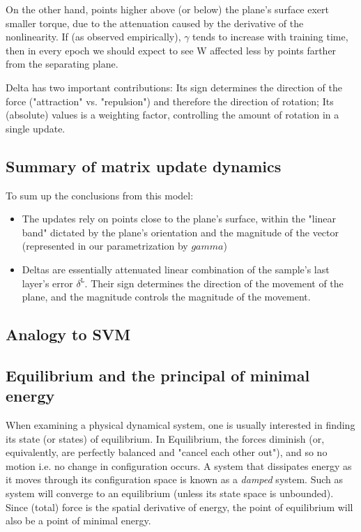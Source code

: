 \documentclass[]{article}
\begin{document}
 		On the other hand, points higher above (or below) the plane's surface exert smaller torque, due to the attenuation caused by the derivative of the nonlinearity. If (as observed empirically), $\gamma$ tends to increase with training time, then in every epoch we should expect to see W affected less by points farther from the separating plane.
 		
 		Delta has two important contributions: Its sign determines the direction of the force ("attraction" vs. "repulsion") and therefore the direction of rotation; Its (absolute) values is a weighting factor, controlling the amount of rotation in a single update.
 	
 	\subsection{Summary of matrix update dynamics}
 		To sum up the conclusions from this model:
 		\begin{itemize}
 			\item The updates rely on points close to the plane's surface, within the "linear band" dictated by the plane's orientation and the magnitude of the vector (represented in our parametrization by $gamma$)
 			\item Deltas are essentially attenuated linear combination of the sample's last layer's error $\delta^\mathtt{L}$. Their sign determines the direction of the movement of the plane, and the magnitude controls the magnitude of the movement.
 		\end{itemize} 
 		
 	\subsection{Analogy to SVM}
 	
 	\subsection{Equilibrium and the principal of minimal energy}	
 		When examining a physical dynamical system, one is usually interested in finding its state (or states) of equilibrium. In Equilibrium, the forces diminish (or, equivalently, are perfectly balanced and "cancel each other out"), and so no motion i.e. no change in configuration occurs. A system that dissipates energy as it moves through its configuration space is known as a \textit{damped} system. Such as system will converge to an equilibrium (unless its state space is unbounded). Since (total) force is the spatial derivative of energy, the point of equilibrium will also be a point of minimal energy.
 		
\end{document}
